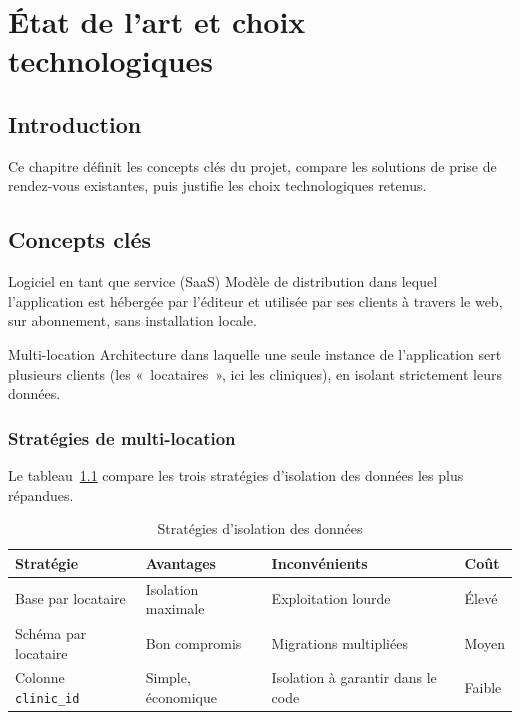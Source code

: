 \chapter{État de l'art et choix technologiques}\label{ch:etat-art}

\section*{Introduction}
Ce chapitre définit les concepts clés du projet, compare les solutions de prise de rendez-vous existantes, puis justifie les choix technologiques retenus.

\section{Concepts clés}
\begin{definition}{Logiciel en tant que service (SaaS)}
Modèle de distribution dans lequel l'application est hébergée par l'éditeur et utilisée par ses clients à travers le web, sur abonnement, sans installation locale.
\end{definition}

\begin{definition}{Multi-location}
Architecture dans laquelle une seule instance de l'application sert plusieurs clients (les «~locataires~», ici les cliniques), en isolant strictement leurs données.
\end{definition}

\subsection{Stratégies de multi-location}
Le tableau~\ref{tab:multi-location} compare les trois stratégies d'isolation des données les plus répandues.

\begin{table}[H]\centering
\caption{Stratégies d'isolation des données}\label{tab:multi-location}
\begin{tabularx}{\linewidth}{lXXl}
\toprule
\textbf{Stratégie} & \textbf{Avantages} & \textbf{Inconvénients} & \textbf{Coût} \\
\midrule
Base par locataire & Isolation maximale & Exploitation lourde & Élevé \\
Schéma par locataire & Bon compromis & Migrations multipliées & Moyen \\
Colonne \texttt{clinic\_id} & Simple, économique & Isolation à garantir dans le code & Faible \\
\bottomrule
\end{tabularx}
\end{table}

